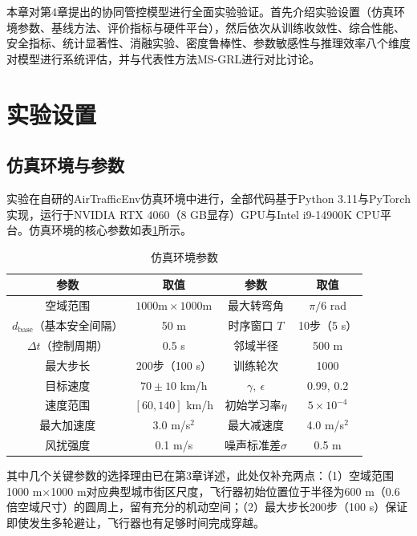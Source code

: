 \documentclass[12pt,a4paper,UTF8]{ctexbook}
\begin{document}
本章对第4章提出的协同管控模型进行全面实验验证。首先介绍实验设置（仿真环境参数、基线方法、评价指标与硬件平台），然后依次从训练收敛性、综合性能、安全指标、统计显著性、消融实验、密度鲁棒性、参数敏感性与推理效率八个维度对模型进行系统评估，并与代表性方法MS-GRL进行对比讨论。

\section{实验设置}

\subsection{仿真环境与参数}

实验在自研的AirTrafficEnv仿真环境中进行，全部代码基于Python 3.11与PyTorch实现，运行于NVIDIA RTX 4060（8 GB显存）GPU与Intel i9-14900K CPU平台。仿真环境的核心参数如表\ref{tab:env}所示。

\begin{table}[H]
    \centering\small
    \caption{仿真环境参数}
    \label{tab:env}
    \begin{tabular}{|c|c|c|c|}
        \hline
        \textbf{参数} & \textbf{取值} & \textbf{参数} & \textbf{取值} \\
        \hline
        空域范围 & $1000\text{m}\times1000\text{m}$ & 最大转弯角 & $\pi/6$ rad \\
        $d_{\text{base}}$（基本安全间隔） & 50 m & 时序窗口 $T$ & 10步（5 s） \\
        $\Delta t$（控制周期） & 0.5 s & 邻域半径 & 500 m \\
        最大步长 & 200步（100 s） & 训练轮次 & 1000 \\
        目标速度 & $70\pm10$ km/h & $\gamma,\ \epsilon$ & 0.99, 0.2 \\
        速度范围 & $[60, 140]$ km/h & 初始学习率$\eta$ & $5\times10^{-4}$ \\
        最大加速度 & 3.0 m/s$^2$ & 最大减速度 & 4.0 m/s$^2$ \\
        风扰强度 & 0.1 m/s & 噪声标准差$\sigma$ & 0.5 m \\
        \hline
    \end{tabular}
\end{table}

其中几个关键参数的选择理由已在第3章详述，此处仅补充两点：（1）空域范围1000 m×1000 m对应典型城市街区尺度，飞行器初始位置位于半径为600 m（0.6倍空域尺寸）的圆周上，留有充分的机动空间；（2）最大步长200步（100 s）保证即使发生多轮避让，飞行器也有足够时间完成穿越。
\end{document}
